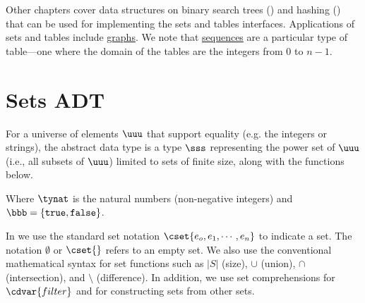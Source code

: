 \begin{gram}
Other chapters cover data structures on binary search trees
() and hashing () that can be used for
implementing the sets and tables interfaces. 
%
Applications of sets and tables include \href{ch:graphs::graphs}{graphs}.
%
We note that \href{ch:sequences::adt}{sequences} are a particular type of table---one where the domain of the tables are the integers from $0$ to $n-1$.  
\end{gram}



\section{Sets ADT}

\begin{datatype}[Sets]

\label{XXadt:sets} 

For a universe of elements $\uuu$ that support equality (e.g. the integers or strings), the 
 abstract data type is a type $\sss$ representing the power 
set of $\uuu$ (i.e., all subsets of $\uuu$) limited to sets of finite 
size, along with the functions below. 
{\normalsize

}
Where $\tynat$ is 
the natural numbers (non-negative integers) and $\bbb = \{\texttt{true},
\texttt{false}\}$.
\end{datatype}

\begin{syntax}[Sets] 
\label{XXsyn:sets}
In \pml{}  we use the standard set notation $\cset{e_o,e_1,\cdots,e_n}$ to
  indicate a set.  The notation $\emptyset$ or $\cset{}$ refers to an
  empty set. We also use the conventional mathematical syntax for set
  functions such as $|S|$ (size), $\cup$ (union), $\cap$
  (intersection), and $\setminus$ (difference).  In addition, we use
  set comprehensions for $\cdvar{filter}$ and for constructing sets from
  other sets.
\end{syntax}

